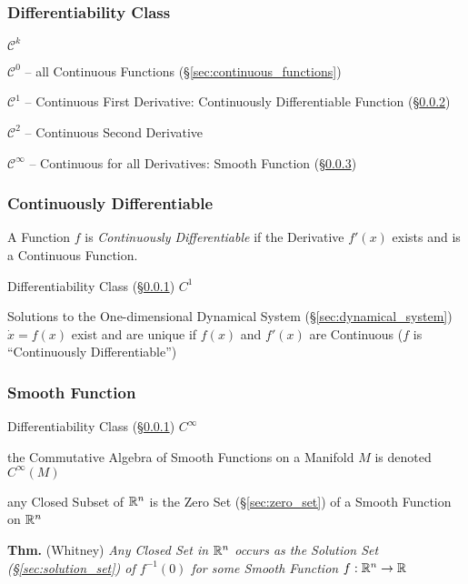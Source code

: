\subsubsection{Differentiability Class}\label{sec:differentiability_class}

$\mathcal{C}^k$

$\mathcal{C}^0$ -- all Continuous Functions (\S\ref{sec:continuous_functions})

$\mathcal{C}^1$ -- Continuous First Derivative: Continuously Differentiable
Function (\S\ref{sec:continuously_differentiable})

$\mathcal{C}^2$ -- Continuous Second Derivative

$\mathcal{C}^\infty$ -- Continuous for all Derivatives: Smooth Function
(\S\ref{sec:smooth_function})



\subsubsection{Continuously Differentiable}
\label{sec:continuously_differentiable}

A Function $f$ is \emph{Continuously Differentiable} if the Derivative $f'(x)$
exists and is a Continuous Function.

Differentiability Class (\S\ref{sec:differentiability_class}) $C^1$

Solutions to the One-dimensional Dynamical System
(\S\ref{sec:dynamical_system}) $\dot{x} = f(x)$ exist and are unique if $f(x)$
and $f'(x)$ are Continuous ($f$ is ``Continuously Differentiable'')



\subsubsection{Smooth Function}\label{sec:smooth_function}

Differentiability Class (\S\ref{sec:differentiability_class}) $C^{\infty}$

the Commutative Algebra of Smooth Functions on a Manifold $M$ is denoted
$C^\infty(M)$ %

any Closed Subset of $\mathbb{R}^n$ is the Zero Set (\S\ref{sec:zero_set}) of a
Smooth Function on $\mathbb{R}^n$

\textbf{Thm.} (Whitney) \emph{Any Closed Set in $\mathbb{R}^n$ occurs as the
  Solution Set (\S\ref{sec:solution_set}) of $f^{-1}(0)$ for some Smooth
  Function $f : \mathbb{R}^n \rightarrow \mathbb{R}$}



